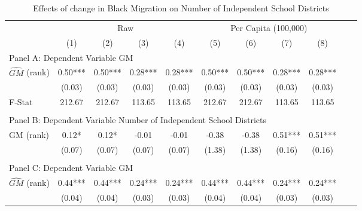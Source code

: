  \begin{table}[htbp]\centering {} \begin{threeparttable} \caption{Effects of change in Black Migration on Number of Independent School Districts} \begin{tabular}{l*{10}{c}} \toprule
                &\multicolumn{4}{c}{Raw}                                    &\multicolumn{4}{c}{Per Capita (100,000)}                   \\\cmidrule(lr){2-5}\cmidrule(lr){6-9}
                &\multicolumn{1}{c}{(1)}   &\multicolumn{1}{c}{(2)}   &\multicolumn{1}{c}{(3)}   &\multicolumn{1}{c}{(4)}   &\multicolumn{1}{c}{(5)}   &\multicolumn{1}{c}{(6)}   &\multicolumn{1}{c}{(7)}   &\multicolumn{1}{c}{(8)}   \\
\cmidrule(lr){1-9}
\multicolumn{8}{l}{Panel A: Dependent Variable GM}\\
\cmidrule(lr){1-9}
$\hat{GM}$ (rank)&       0.50***&       0.50***&       0.28***&       0.28***&       0.50***&       0.50***&       0.28***&       0.28***\\
                &     (0.03)   &     (0.03)   &     (0.03)   &     (0.03)   &     (0.03)   &     (0.03)   &     (0.03)   &     (0.03)   \\
\midrule
F-Stat          &     212.67   &     212.67   &     113.65   &     113.65   &     212.67   &     212.67   &     113.65   &     113.65   \\
\cmidrule[\heavyrulewidth](lr){1-9} \\ \cmidrule[\heavyrulewidth](lr){1-9}
\multicolumn{8}{l}{Panel B: Dependent Variable Number of Independent School Districts}\\
\cmidrule(lr){1-9}
GM  (rank)      &       0.12*  &       0.12*  &      -0.01   &      -0.01   &      -0.38   &      -0.38   &       0.51***&       0.51***\\
                &     (0.07)   &     (0.07)   &     (0.07)   &     (0.07)   &     (1.38)   &     (1.38)   &     (0.16)   &     (0.16)   \\
\cmidrule[\heavyrulewidth](lr){1-9} \\ \cmidrule[\heavyrulewidth](lr){1-9}
\multicolumn{8}{l}{Panel C: Dependent Variable GM}\\
\cmidrule(lr){1-9}
$\hat{GM}$ (rank)&       0.44***&       0.44***&       0.24***&       0.24***&       0.44***&       0.44***&       0.24***&       0.24***\\
                &     (0.04)   &     (0.04)   &     (0.03)   &     (0.03)   &     (0.04)   &     (0.04)   &     (0.03)   &     (0.03)   \\

\end{tabular}
\end{threeparttable}
\end{table}
